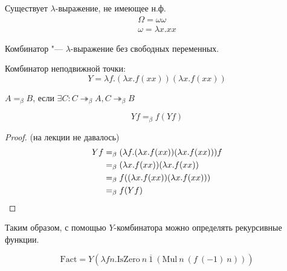 \begin{statement}
    Существует $\lambda$-выражение, не имеющее н.ф.
    \begin{gather*}
        \Omega = \omega \omega \\
        \omega = \lambda x . x x
    \end{gather*}
\end{statement}

\begin{definition}[Комбинатор]
    Комбинатор "--- $\lambda$-выражение без свободных переменных.
\end{definition}

Комбинатор неподвижной точки:
\[
    Y = \lambda f . (\lambda x . f (x x)) (\lambda x . f (x x))
\]

\begin{definition}
    $A=_{\beta}B$, если $\exists C : C \twoheadrightarrow_{\beta} A, C \twoheadrightarrow_{\beta}B$
\end{definition}

\begin{statement}
    \[
        Yf =_{\beta} f(Yf)
    \]
\end{statement}

\begin{proof} (на лекции не давалось)
    \begin{align*}
        Yf &=_{\beta} (\lambda f . (\lambda x . f (x x)) (\lambda x . f (x x))) f \\
           &=_{\beta} (\lambda x . f (x x)) (\lambda x . f (x x)) \\
           &=_{\beta} f ((\lambda x . f (x x)) (\lambda x . f (x x))) \\
           &=_{\beta} f (Y f)
    \qedhere
    \end{align*}
\end{proof}

Таким образом, с помощью $Y$-комбинатора можно определять рекурсивные функции.
\begin{example}
    \[
        \mathrm{Fact} = Y (\lambda{} f n . \mathrm{IsZero}\ n\ \overline{1}\ (\mathrm{Mul}\ n\ (f\ (-1)\ n)))
    \]
\end{example}
